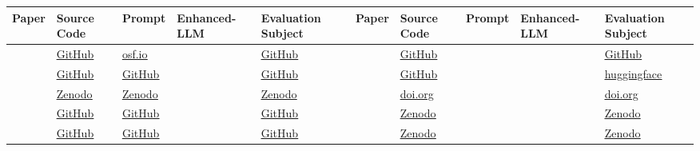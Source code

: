 \begin{tabular} { p{} p{} p{} p{} p{}  | p{} p{} p{} p{} p{}  } \\ 
\toprule 
Paper & Source Code & Prompt & Enhanced-LLM & Evaluation Subject & Paper & Source Code & Prompt & Enhanced-LLM & Evaluation Subject \\ 
\midrule  
\cite{ \papernineteenth } & \href{https://github.com/IlKaiser/text2uml}{\underline{GitHub}} & \href{https://osf.io/4sr5v}{\underline{osf.io}} &  & \href{https://github.com/IlKaiser/text2uml}{\underline{GitHub}} & \cite{ \papertwohundredfifteenth } & \href{https://github.com/20001LastOrder/LLM-AbsCon}{\underline{GitHub}} &  &  & \href{https://github.com/20001LastOrder/LLM-AbsCon}{\underline{GitHub}}\\ 
\cite{ \paperthirtyfirst } & \href{https://github.com/fit-alessandro-berti/pm-llm-benchmark}{\underline{GitHub}} & \href{https://github.com/fit-alessandro-berti/pm-llm-benchmark/tree/main/questions}{\underline{GitHub}} &  & \href{https://github.com/fit-alessandro-berti/pm-llm-benchmark}{\underline{GitHub}} & \cite{ \papertwohundredthirtieth } & \href{https://github.com/SarahayadAOU/MutuallyExclusive}{\underline{GitHub}} &  &  & \href{https://huggingface.co/datasets/AyadSarah/MutuallyExclusive}{\underline{huggingface}}\\ 
\cite{ \paperfiftysecond } & \href{https://zenodo.org/records/13827683}{\underline{Zenodo}} & \href{https://zenodo.org/records/13827683}{\underline{Zenodo}} &  & \href{https://zenodo.org/records/13827683}{\underline{Zenodo}} & \cite{ \papertwohundredthirtysecond } & \href{https://doi.org/10.5281/zenodo.15660803}{\underline{doi.org}} &  &  & \href{https://doi.org/10.5281/zenodo.15660803}{\underline{doi.org}}\\ 
\cite{ \paperfiftyninth } & \href{https://github.com/YujingYang666777/DomainModelGeneration}{\underline{GitHub}} & \href{https://github.com/YujingYang666777/DomainModelGeneration}{\underline{GitHub}} &  & \href{https://github.com/YujingYang666777/DomainModelGeneration}{\underline{GitHub}} & \cite{ \papertwohundredthirtyeighth } & \href{https://zenodo.org/records/14730727}{\underline{Zenodo}} &  &  & \href{https://zenodo.org/records/14730727}{\underline{Zenodo}}\\ 
\cite{ \paperninetyfourth } & \href{https://github.com/hoerb1337/LLMmodel2text/tree/main}{\underline{GitHub}} & \href{https://github.com/hoerb1337/LLMmodel2text/tree/main}{\underline{GitHub}} &  & \href{https://github.com/hoerb1337/LLMmodel2text/tree/main}{\underline{GitHub}} & \cite{ \papertwohundredfortyfourth } & \href{https://zenodo.org/records/16967398}{\underline{Zenodo}} &  &  & \href{https://zenodo.org/records/16967398}{\underline{Zenodo}}\\ 

\end{tabular}
